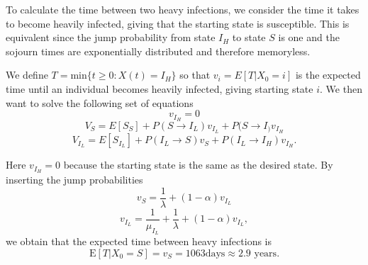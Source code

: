 To calculate the time between two heavy infections, we consider the time it takes to become heavily infected, giving that the starting state is susceptible. This is equivalent since the jump probability from state $I_H$ to state $S$ is one and the sojourn times are exponentially distributed and therefore memoryless.

We define $T = \text{min}\{t \geq 0 : X(t)=I_H\}$ so that $v_i = E\left[T|X_0 = i \right]$ is the expected time until an individual becomes heavily infected, giving starting state $i$. We then want to solve the following set of equations 
$$v_{I_H} = 0$$
$$V_{S} = E[S_S] + P(S \rightarrow I_L) v_{I_L}+ P(S \rightarrow I_) v_{I_H} $$
$$V_{I_L} = E[S_{I_L}] + P(I_L \rightarrow S) v_S + P(I_L \rightarrow I_H) v_{I_H}. $$

Here $v_{I_H} = 0$ because the starting state is the same as the desired state. By inserting the jump probabilities 
$$ v_{S} = \frac{1}{\lambda} + (1-\alpha) v_{I_L} $$
$$ v_{I_L} =  \frac{1}{\mu_{I_L}}+  \frac{1}{\lambda} + (1-\alpha) v_{I_L}, $$
 we obtain that the expected time between heavy infections is
$$\text{E}\left[T|X_0=S \right] = v_S = 1063 \text{days} \approx 2.9 \text{ years}.$$ 